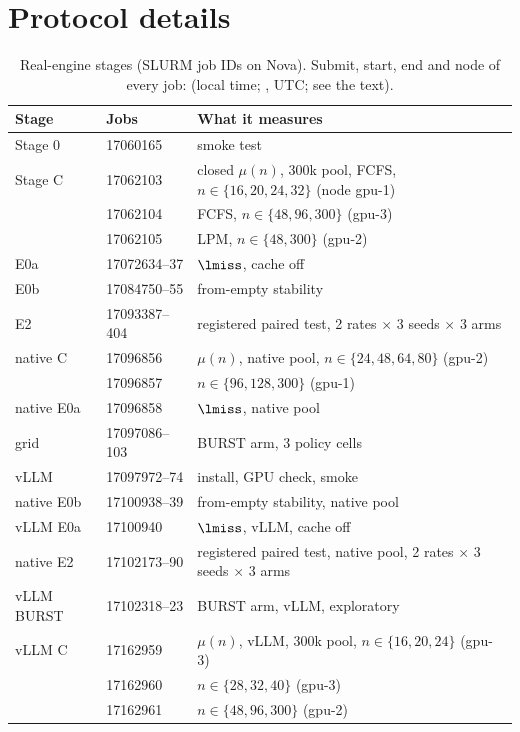 \section{Protocol details}\label{app:protocol}

\begin{table}[htbp]
\centering\footnotesize\renewcommand{\arraystretch}{0.9}
\caption{Real-engine stages (SLURM job IDs on Nova). Submit, start, end and node of every job:  (local time; , UTC; see the text).}\label{tab:stages}
\begin{tabular}{@{}l l p{3.6cm}@{}}
\toprule
Stage & Jobs & What it measures\\
\midrule
Stage 0 & 17060165 & smoke test\\
Stage C & 17062103 & closed $\mu(n)$, 300k pool, FCFS, $n\in\{16,20,24,32\}$ (node gpu-1)\\
 & 17062104 & FCFS, $n\in\{48,96,300\}$ (gpu-3)\\
 & 17062105 & LPM, $n\in\{48,300\}$ (gpu-2)\\
E0a & 17072634--37 & $\lmiss$, cache off\\
E0b & 17084750--55 & from-empty stability\\
E2 & 17093387--404 & registered paired test, 2 rates $\times$ 3 seeds $\times$ 3 arms\\
native C & 17096856 & $\mu(n)$, native pool, $n\in\{24,48,64,80\}$ (gpu-2)\\
 & 17096857 & $n\in\{96,128,300\}$ (gpu-1)\\
native E0a & 17096858 & $\lmiss$, native pool\\
grid & 17097086--103 & BURST arm, 3 policy cells\\
vLLM & 17097972--74 & install, GPU check, smoke\\
native E0b & 17100938--39 & from-empty stability, native pool\\
vLLM E0a & 17100940 & $\lmiss$, vLLM, cache off\\
native E2 & 17102173--90 & registered paired test, native pool, 2 rates $\times$ 3 seeds $\times$ 3 arms\\
vLLM BURST & 17102318--23 & BURST arm, vLLM, exploratory\\
vLLM C & 17162959 & $\mu(n)$, vLLM, 300k pool, $n\in\{16,20,24\}$ (gpu-3)\\
 & 17162960 & $n\in\{28,32,40\}$ (gpu-3)\\
 & 17162961 & $n\in\{48,96,300\}$ (gpu-2)\\

\end{tabular}
\end{table}
